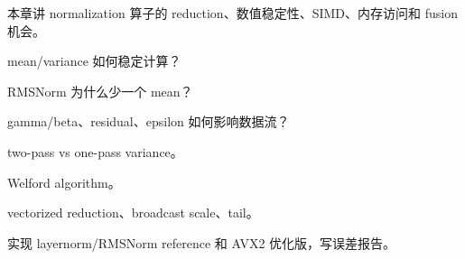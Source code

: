 {本章讲 normalization 算子的 reduction、数值稳定性、SIMD、内存访问和 fusion 机会。}
{\item mean/variance 如何稳定计算？
\item RMSNorm 为什么少一个 mean？
\item gamma/beta、residual、epsilon 如何影响数据流？}
{\item two-pass vs one-pass variance。
\item Welford algorithm。
\item vectorized reduction、broadcast scale、tail。}
{实现 layernorm/RMSNorm reference 和 AVX2 优化版，写误差报告。}
